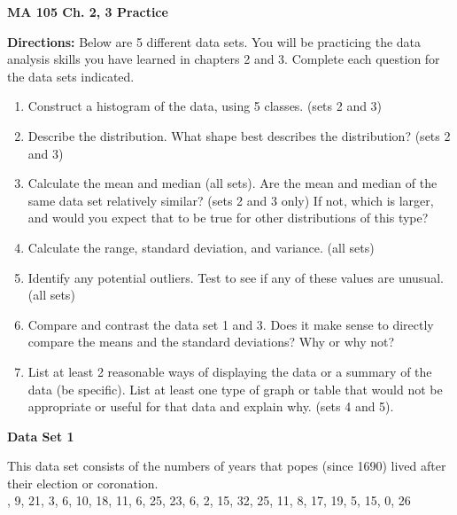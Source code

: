 \documentclass[fleqn, letterpaper]{article}
\begin{document}
\noindent

\begin{center}\textbf{MA 105 Ch. 2, 3 Practice}\end{center}

\noindent
{\bfseries Directions:} Below are 5 different data sets. You will be practicing the data analysis skills you have learned in chapters 2 and 3. Complete each question for the data sets indicated.

\begin{enumerate}
\item Construct a histogram of the data, using 5 classes. (sets 2 and 3)
\item Describe the distribution. What shape best describes the distribution? (sets 2 and 3)
\item Calculate the mean and median (all sets). Are the mean and median of the same data set relatively similar? (sets 2 and 3 only) If not, which is larger, and would you expect that to be true for other distributions of this type?
\item Calculate the range, standard deviation, and variance. (all sets)
\item Identify any potential outliers. Test to see if any of these values are unusual. (all sets)
\item Compare and contrast the data set 1 and 3. Does it make sense to directly compare the means and the standard deviations? Why or why not?
\item List at least 2 reasonable ways of displaying the data or a summary of the data (be specific). List at least one type of graph or table that would not be appropriate or useful for that data and explain why. (sets 4 and 5).
\end{enumerate}

\noindent
{\bfseries Data Set 1}


\noindent
This data set consists of the numbers of years that popes (since 1690) lived after their election or coronation. \\


, 9, 21, 3, 6, 10, 18, 11, 6, 25, 23, 6, 2, 15, 32, 25, 11, 8, 17, 19, 5, 15, 0, 26\\

\end{document}
